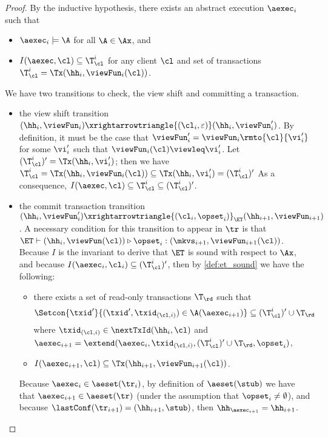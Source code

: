 \begin{proof}
By the inductive hypothesis, there exists an abstract execution $\aexec_i$ such that  
\begin{itemize}
\item $\aexec_{i} \models \A$ for all $\A \in \Ax$, and 
\item $I(\aexec, \cl) \subseteq \T_{\cl}^{i}$ for any client $\cl$ and set of transactions $\T_{\cl}^{i} = \Tx(\hh_{i}, \viewFun_{i}(\cl))$.
\end{itemize}

We have two transitions to check, the view shift and committing a transaction.
\begin{itemize}
\item the view shift transition $(\hh_{i}, \viewFun_{i}) \xrightarrowtriangle{(\cl_{i}, \varepsilon)} (\hh_{i}, \viewFun'_{i})$. 
By definition, it must be the case that $\viewFun'_{i} = \viewFun_{i}\rmto{\cl}{\vi'_{i}}$ 
for some $\vi'_{i}$ such that $\viewFun_{i}(\cl) \viewleq \vi'_{i}$.
Let $(\T_{\cl}^{i})' = \Tx(\hh_{i}, \vi'_{i})$; then we have 
\(
\T_{\cl}^{i} = \Tx(\hh_{i}, \viewFun_{i}(\cl)) \subseteq \Tx(\hh_{i}, \vi'_{i}) = (\T_{\cl}^{i})'
\)
As a consequence, $I(\aexec, \cl) \subseteq \T_{\cl}^{i} \subseteq (\T_{\cl}^{i})'$.

\item the commit transaction transition $(\hh_{i}, \viewFun_{i}') \xrightarrowtriangle{(\cl_{i}, \opset_{i})}_{\ET} 
(\hh_{i+1}, \viewFun_{i+1})$.
A necessary condition for this transition 
to appear in $\tr$ is that $\ET \vdash (\hh_{i}, \viewFun(\cl)) \triangleright \opset_{i}: (\mkvs_{i+1},\viewFun_{i+1}(\cl))$. 
Because $I$ is the invariant to derive that $\ET$ is sound with respect to $\Ax$, 
and because $I(\aexec_{i}, \cl_{i}) \subseteq (\T^{i}_{\cl})'$, 
then by \cref{def:et_sound} we have the following:
\begin{itemize}
\item there exists a set of read-only transactions $\T_\rd$ 
    such that 
    \[
        \Setcon{\txid' }{ (\txid', \txid_{(\cl, i)}) \in \A(\aexec_{i+1})} \subseteq (\T^{i}_{\cl})' \cup \T_\rd
    \]
where 
$\txid_{(\cl, i)} \in \nextTxId(\hh_{i}, \cl)$
and $\aexec_{i+1} = \extend(\aexec_{i}, \txid_{(\cl, i)}, (\T^{i}_{\cl})' \cup \T_\rd, \opset_{i})$,
\item  $I(\aexec_{i+1}, \cl) \subseteq \Tx(\hh_{i+1}, \viewFun_{i+1}(\cl))$.
\end{itemize} 
Because $\aexec_{i} \in \aeset(\tr_{i})$, by definition of $\aeset(\stub)$ we have that 
$\aexec_{i+1} \in \aeset(\tr)$ (under the assumption that $\opset_{i} \neq \emptyset$), 
and because $\lastConf(\tr_{i+1}) = (\hh_{i+1}, \stub)$, then $\hh_{\aexec_{i+1}} = \hh_{i+1}$. 


\end{itemize}
\end{proof}
